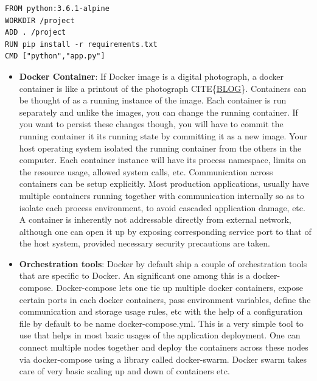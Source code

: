 \documentclass[12pt,titlepage]{article}
\begin{document}
\begin{lstlisting}
FROM python:3.6.1-alpine
WORKDIR /project
ADD . /project
RUN pip install -r requirements.txt
CMD ["python","app.py"]
\end{lstlisting}

\begin{itemize}
\item \textbf{Docker Container}: If Docker image is a digital photograph, a docker container is like a printout
of the photograph CITE\{\href{https://stackify.com/docker-image-vs-container-everything-you-need-to-know/}{BLOG}\}. Containers can be thought of as a running instance
of the image. Each container is run separately and unlike the images, you can
change the running container. If you want to persist these changes though, you
will have to commit the running container it its running state by committing it
as a new image. Your host operating system isolated the running container from
the others in the computer. Each container instance will have its process
namespace, limits on the resource usage, allowed system calls, etc.
Communication across containers can be setup explicitly. Most production
applications, usually have multiple containers running together with
communication internally so as to isolate each process environment, to avoid
cascaded application damage, etc. A container is inherently not addressable
directly from external network, although one can open it up by exposing
corresponding service port to that of the host system, provided necessary
security precautions are taken.

\item \textbf{Orchestration tools}: Docker by default ship a couple of orchestration tools that are specific to
Docker. An significant one among this is a docker-compose. Docker-compose lets
one tie up multiple docker containers, expose certain ports in each docker
containers, pass environment variables, define the communication and storage
usage rules, etc with the help of a configuration file by default to be name
docker-compose.yml. This is a very simple tool to use that helps in most basic
usages of the application deployment. One can connect multiple nodes together
and deploy the containers across these nodes via docker-compose using a library
called docker-swarm. Docker swarm takes care of very basic scaling up and down
of containers etc.
\end{itemize}
\end{document}
